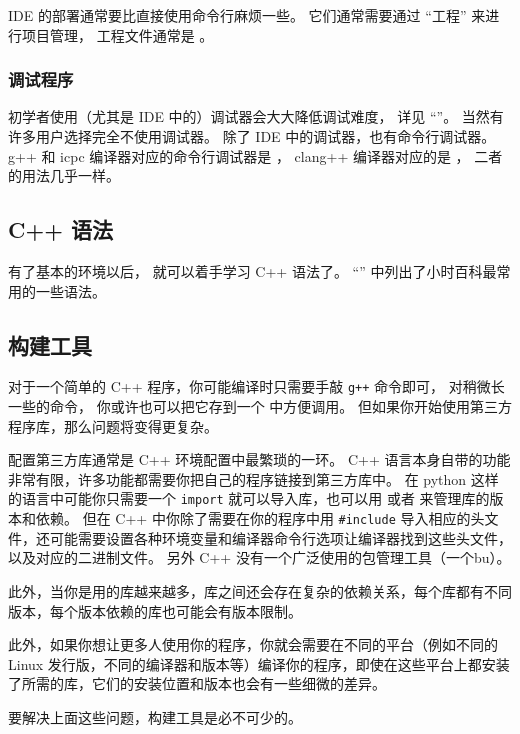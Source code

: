 IDE 的部署通常要比直接使用命令行麻烦一些。 它们通常需要通过 “工程” 来进行项目管理， 工程文件通常是 。

\subsubsection{调试程序}
初学者使用（尤其是 IDE 中的）调试器会大大降低调试难度， 详见 “”。 当然有许多用户选择完全不使用调试器。 除了 IDE 中的调试器，也有命令行调试器。 g++ 和 icpc 编译器对应的命令行调试器是 ， clang++ 编译器对应的是 ， 二者的用法几乎一样。

\subsection{C++ 语法}
有了基本的环境以后， 就可以着手学习 C++ 语法了。 “” 中列出了小时百科最常用的一些语法。

\subsection{构建工具}
对于一个简单的 C++ 程序，你可能编译时只需要手敲 \verb`g++` 命令即可， 对稍微长一些的命令， 你或许也可以把它存到一个 中方便调用。 但如果你开始使用第三方程序库，那么问题将变得更复杂。

配置第三方库通常是 C++ 环境配置中最繁琐的一环。 C++ 语言本身自带的功能非常有限，许多功能都需要你把自己的程序链接到第三方库中。 在 python 这样的语言中可能你只需要一个 \verb`import` 就可以导入库，也可以用  或者  来管理库的版本和依赖。 但在 C++ 中你除了需要在你的程序中用 \verb`#include` 导入相应的头文件，还可能需要设置各种环境变量和编译器命令行选项让编译器找到这些头文件，以及对应的二进制文件。 另外 C++ 没有一个广泛使用的包管理工具（一个bu）。

此外，当你是用的库越来越多，库之间还会存在复杂的依赖关系，每个库都有不同版本，每个版本依赖的库也可能会有版本限制。

此外，如果你想让更多人使用你的程序，你就会需要在不同的平台（例如不同的 Linux 发行版，不同的编译器和版本等）编译你的程序，即使在这些平台上都安装了所需的库，它们的安装位置和版本也会有一些细微的差异。

要解决上面这些问题，构建工具是必不可少的。
